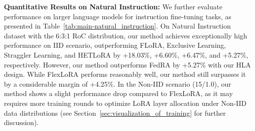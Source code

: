 \documentclass[lettersize,journal]{IEEEtran}
\begin{document}
{\textbf{Quantitative Results on Natural Instruction:} 
We further evaluate performance on larger language models for instruction fine-tuning tasks, as presented in Table~\ref{tab:main-natural_instruction}. On Natural Instruction dataset with the 6:3:1 RoC distribution, our method achieves exceptionally high performance on IID scenario, outperforming FLoRA, Exclusive Learning, Straggler Learning, and HETLoRA by +18.03\%, +6.60\%, +6.47\%, and +5.27\%, respectively. However, our method outperforms FedRA by +5.27\% with our HLA design. While FlexLoRA performs reasonably well, our method still surpasses it by a considerable margin of +4.25\%. In the Non-IID scenario (15/1.0), our method shows a slight performance drop compared to FlexLoRA, as it may requires more training rounds to optimize LoRA layer allocation under Non-IID data distributions (see Section~\ref{sec:visualization_of_training} for further discussion).
}
\end{document}

